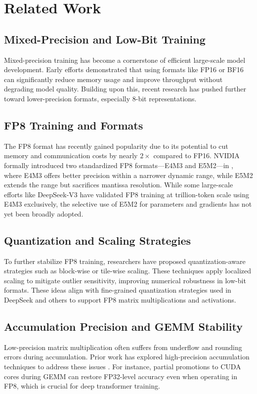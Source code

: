\documentclass[conference]{IEEEtran}
\begin{document}
\section{Related Work}

\subsection{Mixed-Precision and Low-Bit Training}

Mixed-precision training has become a cornerstone of efficient large-scale model development. Early efforts \cite{narang2017mixed, kalamkar2019study} demonstrated that using formats like FP16 or BF16 can significantly reduce memory usage and improve throughput without degrading model quality. Building upon this, recent research has pushed further toward lower-precision formats, especially 8-bit representations.

\subsection{FP8 Training and Formats}

The FP8 format has recently gained popularity due to its potential to cut memory and communication costs by nearly $2\times$ compared to FP16. NVIDIA formally introduced two standardized FP8 formats—E4M3 and E5M2—in \cite{micikevicius2022fp8formatsdeeplearning}, where E4M3 offers better precision within a narrower dynamic range, while E5M2 extends the range but sacrifices mantissa resolution. While some large-scale efforts like DeepSeek-V3 \cite{deepseekv3} have validated FP8 training at trillion-token scale using E4M3 exclusively, the selective use of E5M2 for parameters and gradients has not yet been broadly adopted.

\subsection{Quantization and Scaling Strategies}
To further stabilize FP8 training, researchers have proposed quantization-aware strategies such as block-wise or tile-wise scaling. These techniques apply localized scaling to mitigate outlier sensitivity, improving numerical robustness in low-bit formats. These ideas align with fine-grained quantization strategies used in DeepSeek and others to support FP8 matrix multiplications and activations.

\subsection{Accumulation Precision and GEMM Stability}
Low-precision matrix multiplication often suffers from underflow and rounding errors during accumulation. Prior work has explored high-precision accumulation techniques to address these issues \cite{wortsman2023stable}. For instance, partial promotions to CUDA cores during GEMM can restore FP32-level accuracy even when operating in FP8, which is crucial for deep transformer training.
\end{document}
